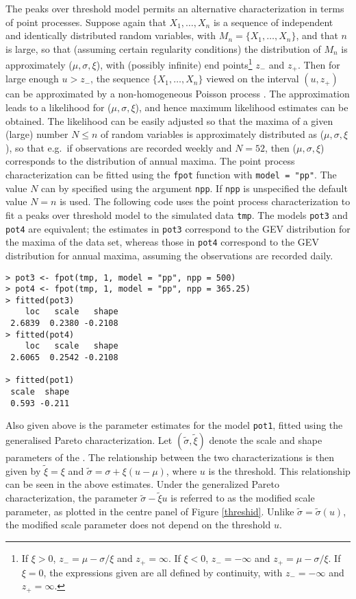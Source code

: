 \documentclass[11pt,a4paper]{article}
\begin{document}
The peaks over threshold model permits an alternative characterization in terms of point processes. 
Suppose again that $X_1,\dots,X_n$ is a sequence of independent and identically distributed random variables, with $M_n = \{X_1,\dots,X_n\}$, and that $n$ is large, so that (assuming certain regularity conditions) the distribution of $M_n$ is approximately ($\mu,\sigma,\xi$), with (possibly infinite) end points\footnote{If $\xi > 0$, $z_- = \mu - \sigma/\xi$ and $z_+ = \infty$. If $\xi < 0$, $z_- = -\infty$ and $z_+ = \mu - \sigma/\xi$. If $\xi = 0$, the expressions given are all defined by continuity, with $z_- = -\infty$ and $z_+ = \infty$.} $z_-$ and $z_+$. Then for large enough $u > z_-$, the sequence $\{X_1,\dots,X_n\}$ viewed on the interval $(u,z_+)$ can be approximated by a non-homogeneous Poisson process \citep{cole01}.
The approximation leads to a likelihood for ($\mu,\sigma,\xi$), and hence maximum likelihood estimates can be obtained.
The likelihood can be easily adjusted so that the maxima of a given (large) number $N \leq n$ of random variables is approximately distributed as ($\mu,\sigma,\xi$), so that e.g.\ if observations are recorded weekly and $N = 52$, then ($\mu,\sigma,\xi$) corresponds to the distribution of annual maxima. 
The point process characterization can be fitted using the \verb+fpot+ function with \verb+model = "pp"+. 
The value $N$ can by specified using the argument \verb+npp+.
If \verb+npp+ is unspecified the default value $N = n$ is used.
The following code uses the point process characterization to fit a peaks over threshold model to the simulated data \verb+tmp+.
The models \verb+pot3+ and \verb+pot4+ are equivalent; the estimates in \verb+pot3+ correspond to the GEV distribution for the maxima of the data set, whereas those in \verb+pot4+ correspond to the GEV distribution for annual maxima, assuming the observations are recorded daily.

\begin{verbatim} 
> pot3 <- fpot(tmp, 1, model = "pp", npp = 500)
> pot4 <- fpot(tmp, 1, model = "pp", npp = 365.25)
> fitted(pot3)
    loc   scale   shape 
 2.6839  0.2380 -0.2108 
> fitted(pot4)
    loc   scale   shape 
 2.6065  0.2542 -0.2108 

> fitted(pot1)
 scale  shape 
 0.593 -0.211 
\end{verbatim}

Also given above is the parameter estimates for the model \verb+pot1+, fitted using the generalised Pareto characterization. Let $(\tilde{\sigma}, \tilde{\xi})$ denote the scale and shape parameters of the . The relationship between the two characterizations is then given by $\tilde{\xi} = \xi$ and $\tilde{\sigma} = \sigma + \xi(u - \mu)$, where $u$ is the threshold.
This relationship can be seen in the above estimates.
Under the generalized Pareto characterization, the parameter $\tilde{\sigma} - \tilde{\xi} u$ is referred to as the modified scale parameter, as plotted in the centre panel of Figure \ref{threshid}. Unlike $\tilde{\sigma} = \tilde{\sigma}(u)$, the modified scale parameter does not depend on the threshold $u$.
\end{document}
